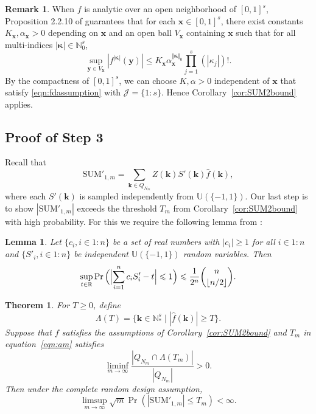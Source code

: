 \documentclass{article}
\newtheorem{theorem}{Theorem}
\newtheorem{lemma}{Lemma}
\theoremstyle{definition}
\newtheorem{remark}{Remark}
\renewcommand{\le}{\leqslant}
\renewcommand{\leq}{\leqslant}
\renewcommand{\geq}{\geqslant}
\newcommand{\cj}{\mathcal{J}}
\newcommand{\natu}{\mathbb{N}}
\newcommand{\bsk}{\boldsymbol{k}}
\newcommand{\bsx}{\boldsymbol{x}}
\newcommand{\bsy}{\boldsymbol{y}}
\newcommand{\bskappa}{\boldsymbol{\kappa}}
\newcommand{\dunif}{\mathbb{U}}
\begin{document}
\begin{remark}
When $f$ is analytic over an open neighborhood of $[0,1]^s$, Proposition 2.2.10 of \cite{krantz2002primer} guarantees that for each $\bsx\in [0,1]^s$, there exist constants $K_{\bsx},\alpha_{\bsx}>0$ depending on $\bsx$ and an open ball $V_{\bsx}$ containing $\bsx$ such that for all multi-indices  $|\bskappa|\in \natu^s_0$,
$$\sup_{\bsy\in V_{\bsx}} |f^{|\bskappa|}(\bsy)|\leq K_{\bsx}\alpha_{\bsx}^{\Vert\bskappa\Vert_0} {\prod_{j=1}^s (|\kappa_j|)!}.$$
By the compactness of $[0,1]^s$, we can choose  $K,\alpha>0$ independent of $\bsx$ that satisfy \eqref{eqn:fdassumption} with $\cj=\{1{:}s\}$. Hence Corollary~\ref{cor:SUM2bound} applies.
\end{remark}

\subsection{Proof of Step 3}\label{subsec:anticoncentration}
Recall that 
$$\mathrm{SUM}'_{1,m}=\sum_{\bsk\in Q_{N_m}}Z(\bsk)S'(\bsk)\hat{f}(\bsk),$$
where each $S'(\bsk)$ is sampled independently from $\dunif(\{-1,1\})$. Our last step is to show $|\mathrm{SUM}'_{1,m}|$ exceeds the threshold $T_m$ from Corollary~\ref{cor:SUM2bound} with high probability. For this we require the following lemma from \cite{erdos:1945}:
\begin{lemma}\label{lem:erdos}
    Let $\{c_i, i\in 1{:}n \}$ be a set of real numbers with $|c_i|\geq 1$ for all $ i\in 1{:}n$ and $\{S'_i, i\in 1{:}n\}$ be independent $\dunif(\{-1,1\})$ random variables. Then 
    $$\sup_{t\in \mathbb{R}}\Pr\Big(\Bigl|\sum_{i=1}^n  c_i S'_i-t\Bigr|\leq 1\Big)\leq \frac{1}{2^n} \binom{n}{\lfloor n/2\rfloor}.$$
\end{lemma}

\begin{theorem}\label{thm:SUM1am}
For $T\geq 0$, define
$$\Lambda(T)=\{\bsk\in \natu^s_*\mid |\hat{f}(\bsk)|\geq T\}.$$
Suppose that $f$ satisfies the assumptions of Corollary~\ref{cor:SUM2bound} and $T_m$ in equation~\eqref{eqn:am} satisfies
 \begin{equation}\label{eqn:Qmam}
 \liminf_{m\to\infty}\frac{|Q_{N_m}\cap \Lambda(T_m)|}{|Q_{N_m}|}>0.
 \end{equation}
 Then under the complete random design assumption, 
\begin{equation*}
    \limsup_{m\to\infty}\sqrt{m}\Pr(|\mathrm{SUM}'_{1,m}|\le T_m)<\infty.
\end{equation*}
\end{theorem}
\end{document}

